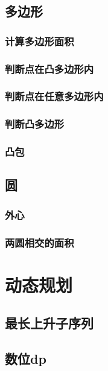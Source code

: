 \documentclass[twocolumn,a4]{article}%
\begin{document}
\subsection{多边形}
    \subsubsection{计算多边形面积}
    
    \subsubsection{判断点在凸多边形内}
    
    \subsubsection{判断点在任意多边形内}
    
    \subsubsection{判断凸多边形}
    
    \subsubsection{凸包}
    
\subsection{圆}
    \subsubsection{外心}
    
    \subsubsection{两圆相交的面积}
    
\section{动态规划}
\subsection{最长上升子序列}

\subsection{数位dp}

\end{document}
